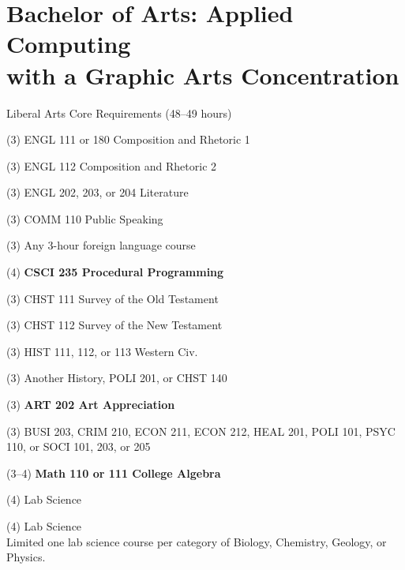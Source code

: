 %
\section*{Bachelor of Arts: Applied Computing\\with a Graphic Arts Concentration}

\begin{reqgroup}{Liberal Arts Core Requirements (48--49 hours)}
\begin{checklist}
\begin{minipage}[t]{0.5\linewidth}
	\item (3) ENGL 111 or 180 Composition and Rhetoric 1
	\item (3) ENGL 112 Composition and Rhetoric 2
	\item (3) ENGL 202, 203, or 204 Literature
	\item (3) COMM 110 Public Speaking
	\item (3) Any 3-hour foreign language course
	\item (4) \textbf{CSCI 235  Procedural Programming}
	\item (3) CHST 111  Survey of the Old Testament
	\item (3) CHST 112  Survey of the New Testament
	\item (3) HIST 111, 112, or 113 Western Civ.
\end{minipage}
\begin{minipage}[t]{0.5\linewidth}
	\item (3)	Another History, POLI 201, or CHST 140
	\item (3)	\textbf{ART 202 Art Appreciation}
	\item (3)	BUSI 203, CRIM 210, ECON 211, ECON 212, HEAL 201, POLI 101, PSYC 110, or SOCI 101, 203, or 205
	\item (3--4)	\textbf{Math 110 or 111 College Algebra}
	\item (4)	Lab Science
	\item (4)	Lab Science\\Limited one lab science course per category of Biology, Chemistry,
Geology, or Physics.
\end{minipage}
\end{checklist}
\end{reqgroup}

